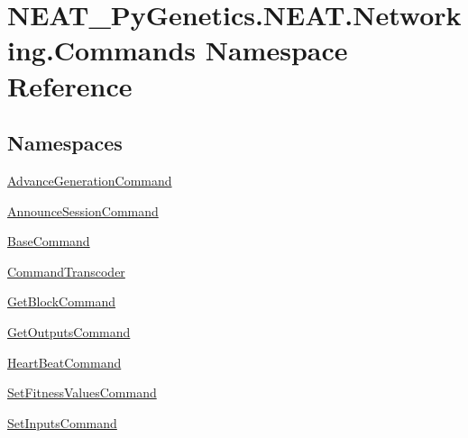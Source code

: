 \hypertarget{namespaceNEAT__PyGenetics_1_1NEAT_1_1Networking_1_1Commands}{}\section{N\+E\+A\+T\+\_\+\+Py\+Genetics.\+N\+E\+A\+T.\+Networking.\+Commands Namespace Reference}
\label{namespaceNEAT__PyGenetics_1_1NEAT_1_1Networking_1_1Commands}
\subsection*{Namespaces}
\begin{DoxyCompactItemize}
\item 
 \hyperlink{namespaceNEAT__PyGenetics_1_1NEAT_1_1Networking_1_1Commands_1_1AdvanceGenerationCommand}{Advance\+Generation\+Command}
\item 
 \hyperlink{namespaceNEAT__PyGenetics_1_1NEAT_1_1Networking_1_1Commands_1_1AnnounceSessionCommand}{Announce\+Session\+Command}
\item 
 \hyperlink{namespaceNEAT__PyGenetics_1_1NEAT_1_1Networking_1_1Commands_1_1BaseCommand}{Base\+Command}
\item 
 \hyperlink{namespaceNEAT__PyGenetics_1_1NEAT_1_1Networking_1_1Commands_1_1CommandTranscoder}{Command\+Transcoder}
\item 
 \hyperlink{namespaceNEAT__PyGenetics_1_1NEAT_1_1Networking_1_1Commands_1_1GetBlockCommand}{Get\+Block\+Command}
\item 
 \hyperlink{namespaceNEAT__PyGenetics_1_1NEAT_1_1Networking_1_1Commands_1_1GetOutputsCommand}{Get\+Outputs\+Command}
\item 
 \hyperlink{namespaceNEAT__PyGenetics_1_1NEAT_1_1Networking_1_1Commands_1_1HeartBeatCommand}{Heart\+Beat\+Command}
\item 
 \hyperlink{namespaceNEAT__PyGenetics_1_1NEAT_1_1Networking_1_1Commands_1_1SetFitnessValuesCommand}{Set\+Fitness\+Values\+Command}
\item 
 \hyperlink{namespaceNEAT__PyGenetics_1_1NEAT_1_1Networking_1_1Commands_1_1SetInputsCommand}{Set\+Inputs\+Command}
\end{DoxyCompactItemize}
